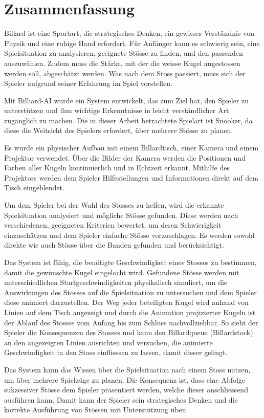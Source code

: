 \chapter{Zusammenfassung}\label{kap:summary}
Billard ist eine Sportart, die strategisches Denken, ein gewisses Verständnis von Physik und eine ruhige Hand erfordert.
Für Anfänger kann es schwierig sein, eine Spielsituation zu analysieren, geeignete Stösse zu finden, und den passenden auszuwählen.
Zudem muss die Stärke, mit der die weisse Kugel angestossen werden soll, abgeschätzt werden.
Was nach dem Stoss passiert, muss sich der Spieler aufgrund seiner Erfahrung im Spiel vorstellen.

Mit Billiard-AI wurde ein System entwickelt, das zum Ziel hat, den Spieler zu unterstützen und ihm wichtige Erkenntnisse
in leicht verständlicher Art zugänglich zu machen.
Die in dieser Arbeit betrachtete Spielart ist Snooker, da diese die Weitsicht des Spielers erfordert, über mehrere Stösse zu planen.

Es wurde ein physischer Aufbau mit einem Billardtisch, einer Kamera und einem Projektor verwendet.
Über die Bilder der Kamera werden die Positionen und Farben aller Kugeln kontinuierlich und in Echtzeit erkannt.
Mithilfe des Projektors werden dem Spieler Hilfestellungen und Informationen direkt auf dem Tisch eingeblendet.

Um dem Spieler bei der Wahl des Stosses zu helfen, wird die erkannte Spielsituation analysiert und mögliche Stösse gefunden.
Diese werden nach verschiedenen, geeigneten Kriterien bewertet, um deren Schwierigkeit einzuschätzen und dem Spieler
einfache Stösse vorzuschlagen.
Es werden sowohl direkte wie auch Stösse über die Banden gefunden und berücksichtigt.

Das System ist fähig, die benötigte Geschwindigkeit eines Stosses zu bestimmen, damit die gewünschte Kugel eingelocht wird.
Gefundene Stösse werden mit unterschiedlichen Startgeschwindigkeiten physikalisch simuliert, um die Auswirkungen
des Stosses auf die Spielsituation zu untersuchen und dem Spieler diese animiert darzustellen.
Der Weg jeder beteiligten Kugel wird anhand von Linien auf dem Tisch angezeigt und durch die Animation projizierter Kugeln
ist der Ablauf des Stosses vom Anfang bis zum Schluss nachvollziehbar.
So sieht der Spieler die Konsequenzen des Stosses und kann den Billardqueue (Billardstock) an den angezeigten Linien ausrichten
und versuchen, die animierte Geschwindigkeit in den Stoss einfliessen zu lassen, damit dieser gelingt.

Das System kann das Wissen über die Spielsituation nach einem Stoss nutzen, um über mehrere Spielzüge zu planen.
Die Konsequenz ist, dass eine Abfolge sukzessiver Stösse dem Spieler präsentiert werden, welche dieser anschliessend
ausführen kann.
Damit kann der Spieler sein strategisches Denken und die korrekte Ausführung von Stössen mit Unterstützung üben.


